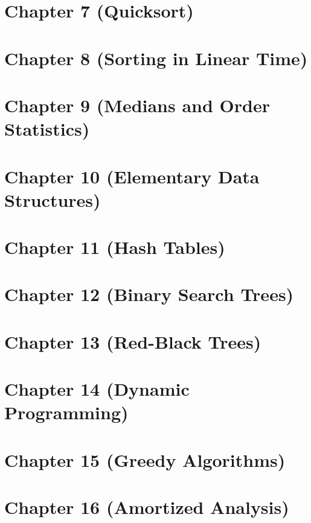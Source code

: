 \documentclass[11pt]{article}
\begin{document}
\section*{Chapter 7 (Quicksort)}
\newpage

\section*{Chapter 8 (Sorting in Linear Time)}
\newpage

\section*{Chapter 9 (Medians and Order Statistics)}
\newpage

\section*{Chapter 10 (Elementary Data Structures)}
\newpage

\section*{Chapter 11 (Hash Tables)}
\newpage

\section*{Chapter 12 (Binary Search Trees)}
\newpage

\section*{Chapter 13 (Red-Black Trees)}
\newpage

\section*{Chapter 14 (Dynamic Programming)}
\newpage

\section*{Chapter 15 (Greedy Algorithms)}
\newpage

\section*{Chapter 16 (Amortized Analysis)}
\newpage
\end{document}
